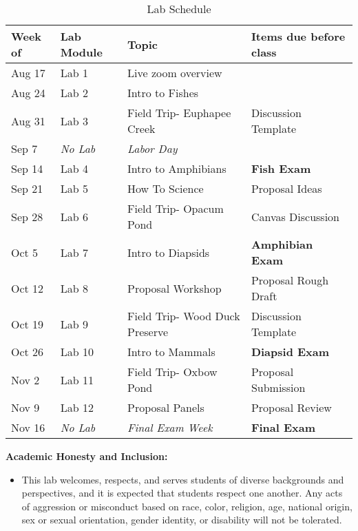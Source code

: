 \documentclass[11pt, a4paper]{article}
\begin{document}
\centering
\begin{table}[h]
\label{Table:Schedule}
\caption{Lab Schedule}
\begin{tabular}{llll}\hline
Week of & Lab Module          & Topic                           & Items due before class  \\ \hline
Aug 17  & Lab 1               & Live zoom overview              &                         \\
Aug 24  & Lab 2               & Intro to Fishes                 &                         \\
Aug 31  & Lab 3               & Field Trip- Euphapee Creek      & Discussion Template     \\
Sep 7   & \textit{No Lab}     & \textit{Labor Day}              &                         \\
Sep 14  & Lab 4               & Intro to Amphibians             & \textbf{Fish Exam}      \\
Sep 21  & Lab 5               & How To Science                  & Proposal Ideas          \\
Sep 28  & Lab 6               & Field Trip- Opacum Pond         & Canvas Discussion       \\
Oct 5   & Lab 7               & Intro to Diapsids               & \textbf{Amphibian Exam} \\
Oct 12  & Lab 8               & Proposal Workshop               & Proposal Rough Draft    \\
Oct 19  & Lab 9               & Field Trip- Wood Duck Preserve  & Discussion Template     \\
Oct 26  & Lab 10              & Intro to Mammals                & \textbf{Diapsid Exam}   \\
Nov 2   & Lab 11              & Field Trip- Oxbow Pond          & Proposal Submission     \\
Nov 9   & Lab 12              & Proposal Panels                 & Proposal Review         \\
Nov 16  & \textit{No Lab}     & \textit{Final Exam Week}        & \textbf{Final Exam}     \\ \hline
\end{tabular}
\bigskip{}
\end{table}


\noindent\textbf{Academic Honesty and Inclusion:}
\begin{itemize}
\item{This lab welcomes, respects, and serves students of diverse backgrounds and perspectives, and it is expected that students respect one another. Any acts of aggression or misconduct based on race, color, religion, age, national origin, sex or sexual orientation, gender identity, or disability will not be tolerated.}
\end{itemize}

  
\end{document}
